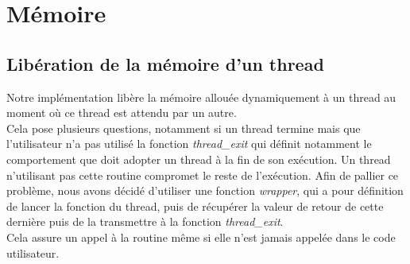 \section{Mémoire}

\subsection{Libération de la mémoire d'un thread}
Notre implémentation libère la mémoire allouée dynamiquement à un thread au moment où ce thread est attendu par un autre. \\ 
Cela pose plusieurs questions, notamment si un thread termine mais que l'utilisateur n'a pas utilisé la fonction \textit{thread\_exit} qui définit notamment le comportement que doit 
adopter un thread à la fin de son exécution. 
Un thread n'utilisant pas cette routine compromet le reste de l'exécution. Afin de pallier ce problème, nous avons décidé d'utiliser une fonction \textit{wrapper}, qui a pour
définition de lancer la fonction du thread, puis de récupérer la valeur de retour de cette dernière puis de la transmettre à la fonction \textit{thread\_exit}.\\ 
Cela assure un appel à la routine même si elle n'est jamais appelée dans le code utilisateur. \\


